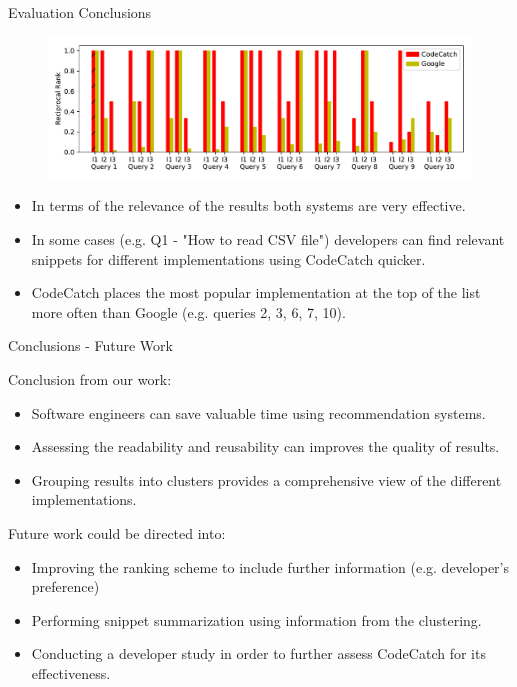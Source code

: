 \documentclass[compress]{beamer}
\begin{document}


\begin{frame}{Evaluation Conclusions}

\begin{figure}
\includegraphics[scale=0.45]{reciprocalrank}
\end{figure}

\vspace{-5pt}
\begin{itemize}
	\item In terms of the {\Medium relevance} of the results both systems are very effective.
	\pause
	\item In some cases (e.g. Q1 - "How to read CSV file") developers can find relevant snippets for different implementations using CodeCatch {\Medium quicker}.
	\pause
	\item CodeCatch places the {\Medium most popular} implementation at the top of the list more often than Google (e.g. queries 2, 3, 6, 7, 10).

\end{itemize}

\end{frame}

\begin{frame}{Conclusions - Future Work}

Conclusion from our work:

\begin{itemize}
	\item Software engineers can save valuable time using recommendation systems.
	\item Assessing the readability and reusability can improves the quality of results.
	\item Grouping results into clusters provides a comprehensive view of the different implementations. 
\end{itemize}

\pause

Future work could be directed into:

\begin{itemize}
	\item Improving the ranking scheme to include further information (e.g. developer's preference)
	\item Performing snippet summarization using information from the clustering.
	\item Conducting a developer study in order to further assess CodeCatch for its effectiveness.
\end{itemize}

\end{frame}
\end{document}
